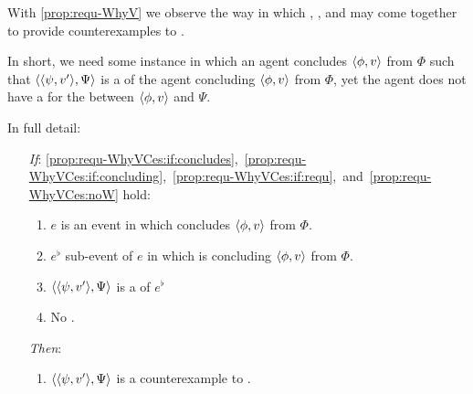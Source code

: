 \begin{note}
  With \autoref{prop:requ-WhyV} we observe the way in which , , and  may come together to provide counterexamples to \issueConstraint{}.

  In short, we need some instance in which an agent concludes \(\langle \phi, v \rangle\) from \(\Phi\) such that \(\langle \langle \psi, v' \rangle, \Psi \rangle\) is a \requ{} of the agent concluding \(\langle \phi, v \rangle\) from \(\Phi\), yet the agent does not have a \wit{} for the \ros{} between \(\langle \phi, v \rangle\) and \(\Psi\).

  In full detail:

  \begin{proposition}
    \label{prop:requ-WhyV-ces}

    \begin{itemize}
    \item[\emph{If}:]
      \ref{prop:requ-WhyVCes:if:concludes},~\ref{prop:requ-WhyVCes:if:concluding},~\ref{prop:requ-WhyVCes:if:requ},~and~\ref{prop:requ-WhyVCes:noW} hold:
      \begin{enumerate}[label=\alph*., ref=(\alph*), series=propRequWhyVSeries]
      \item
        \label{prop:requ-WhyVCes:if:concludes}
        \(e\) is an event in which \vAgent{} concludes \(\langle \phi, v \rangle\) from \(\Phi\).
      \item
        \label{prop:requ-WhyVCes:if:concluding}
        \(e^{\flat}\) sub-event of \(e\) in which \vAgent{} is concluding \(\langle \phi, v \rangle\) from \(\Phi\).
      \item
        \label{prop:requ-WhyVCes:if:requ}
        \(\langle \langle \psi, v' \rangle, \Psi \rangle\) is a \requ{} of \(e^{\flat}\)
      \item
        \label{prop:requ-WhyVCes:noW}
        No \wit{}.
      \end{enumerate}
    \item[\emph{Then}:]
      \begin{enumerate}[label=\alph*., ref=(\alph*), resume*=propRequWhyVSeries]
      \item
        \label{prop:requ-WhyVCes:tn:answer}
        \(\langle \langle \psi, v' \rangle, \Psi \rangle\) is a counterexample to \issueConstraint{}.
      \end{enumerate}
    \end{itemize}
    \vspace{-\baselineskip}
  \end{proposition}


\end{note}
